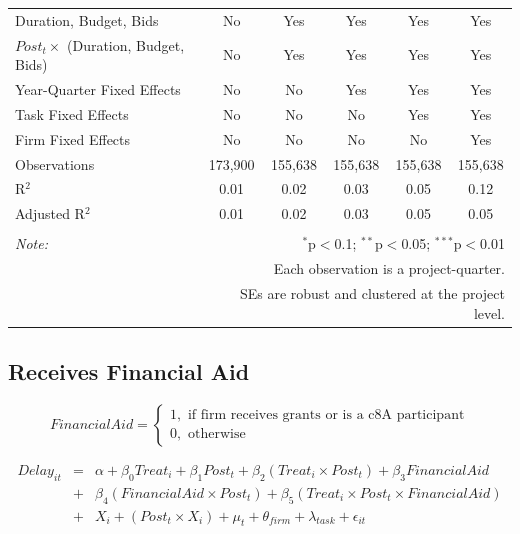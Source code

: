 \documentclass[
]{article}
\begin{document}
\begin{table}[H]
\begin{tabular}{@{\extracolsep{-2pt}}lccccc}
Duration, Budget, Bids & No & Yes & Yes & Yes & Yes \\ 
$Post_t \times $  (Duration, Budget, Bids) & No & Yes & Yes & Yes & Yes \\ 
Year-Quarter Fixed Effects & No & No & Yes & Yes & Yes \\ 
Task Fixed Effects & No & No & No & Yes & Yes \\ 
Firm Fixed Effects & No & No & No & No & Yes \\ 
Observations & 173,900 & 155,638 & 155,638 & 155,638 & 155,638 \\ 
R$^{2}$ & 0.01 & 0.02 & 0.03 & 0.05 & 0.12 \\ 
Adjusted R$^{2}$ & 0.01 & 0.02 & 0.03 & 0.05 & 0.05 \\ 
\hline 
\hline \\[-1.8ex] 
\textit{Note:}  & \multicolumn{5}{r}{$^{*}$p$<$0.1; $^{**}$p$<$0.05; $^{***}$p$<$0.01} \\ 
 & \multicolumn{5}{r}{Each observation is a project-quarter.} \\ 
 & \multicolumn{5}{r}{SEs are robust and clustered at the project level.} \\ 
\end{tabular} 
\end{table}

\hypertarget{receives-financial-aid}{%
\subsection{Receives Financial Aid}\label{receives-financial-aid}}

\[ FinancialAid = \begin{cases} 1, \text{ if firm receives grants or is a c8A participant}\\
0, \text{ otherwise} \end{cases}\]

\[ \begin{aligned}
Delay_{it} &=& \alpha+\beta_0 Treat_i + \beta_1 Post_t + \beta_2 (Treat_i \times Post_t) +\beta_3 FinancialAid \\
&+& \beta_4 (FinancialAid \times Post_t) + \beta_5 (Treat_i \times Post_t \times FinancialAid) \\ 
&+&X_i + (Post_t \times X_i) + \mu_t + \theta_{firm} + \lambda_{task}+ \epsilon_{it}
\end{aligned}\]
\end{document}
